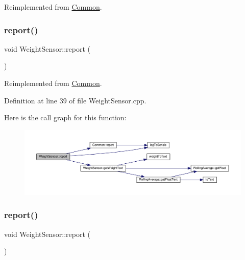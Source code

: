 Reimplemented from \hyperlink{class_common_acd1fdd47fbf8bb490f5c6d3ab6cd8d05}{Common}.

\mbox{\label{class_weight_sensor_a1db622f4f2fb6971d0a4933d825c5c44}} 
\subsubsection{\texorpdfstring{report()}{report()}\hspace{0.1cm}{\footnotesize\ttfamily [1/2]}}
{\footnotesize\ttfamily void Weight\+Sensor\+::report (\begin{DoxyParamCaption}{ }\end{DoxyParamCaption})\hspace{0.3cm}{\ttfamily [virtual]}}



Reimplemented from \hyperlink{class_common_a9e60e2c26a5f4d72342a59a969954636}{Common}.



Definition at line 39 of file Weight\+Sensor.\+cpp.

Here is the call graph for this function\+:
\nopagebreak
\begin{figure}[H]
\begin{center}
\leavevmode
\includegraphics[width=350pt]{class_weight_sensor_a1db622f4f2fb6971d0a4933d825c5c44_cgraph}
\end{center}
\end{figure}
\mbox{\label{class_weight_sensor_a1db622f4f2fb6971d0a4933d825c5c44}} 
\subsubsection{\texorpdfstring{report()}{report()}\hspace{0.1cm}{\footnotesize\ttfamily [2/2]}}
{\footnotesize\ttfamily void Weight\+Sensor\+::report (\begin{DoxyParamCaption}{ }\end{DoxyParamCaption})\hspace{0.3cm}{\ttfamily [virtual]}}



